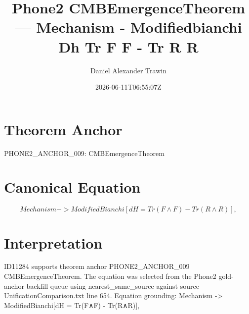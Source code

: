 \documentclass[11pt]{article}
\title{Phone2 CMBEmergenceTheorem — Mechanism - Modifiedbianchi Dh Tr F F - Tr R R}
\author{Daniel Alexander Trawin}
\date{2026-06-11T06:55:07Z}
\begin{document}
\maketitle
\section*{Theorem Anchor}
PHONE2_ANCHOR_009: CMBEmergenceTheorem
\section*{Canonical Equation}
\[
Mechanism -> ModifiedBianchi[dH = Tr(F∧F) - Tr(R∧R)],
\]
\section*{Interpretation}
ID11284 supports theorem anchor PHONE2_ANCHOR_009 CMBEmergenceTheorem. The equation was selected from the Phone2 gold-anchor backfill queue using nearest_same_source against source UnificationComparison.txt line 654. Equation grounding: Mechanism -> ModifiedBianchi[dH = Tr(F∧F) - Tr(R∧R)],
\end{document}
